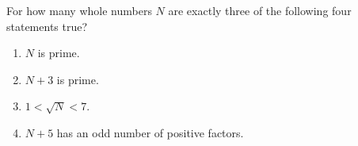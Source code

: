 For how many whole numbers $N$ are exactly three of the following four statements true?
\begin{enumerate}
\item $N$ is prime.
\item $N+3$ is prime.
\item $1<\sqrt N<7$.
\item $N+5$ has an odd number of positive factors.
\end{enumerate}
